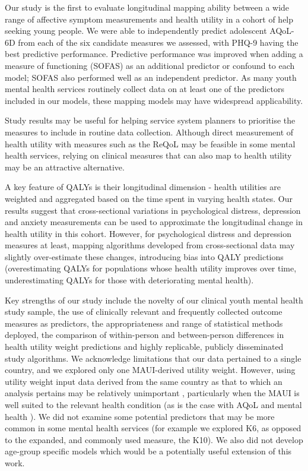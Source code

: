 \documentclass[
  journal=largetwo,
  manuscript=original-article,
  year=2023-Submission,
]{cup-journal}
\begin{document}
Our study is the first to evaluate longitudinal mapping ability between a wide range of affective symptom measurements and health utility in a cohort of help seeking young people. We were able to independently predict adolescent AQoL-6D from each of the six candidate measures we assessed, with PHQ-9 having the best predictive performance. Predictive performance was improved when adding a measure of functioning (SOFAS) as an additional predictor or confound to each model; SOFAS also performed well as an independent predictor. As many youth mental health services routinely collect data on at least one of the predictors included in our models, these mapping models may have widespread applicability.

Study results may be useful for helping service system planners to prioritise the measures to include in routine data collection. Although direct measurement of health utility with measures such as the ReQoL \autocite{KEETHARUTH2021281} may be feasible in some mental health services, relying on clinical measures that can also map to health utility may be an attractive alternative.

A key feature of QALYs is their longitudinal dimension - health utilities are weighted and aggregated based on the time spent in varying health states. Our results suggest that cross-sectional variations in psychological distress, depression and anxiety measurements can be used to approximate the longitudinal change in health utility in this cohort. However, for psychological distress and depression measures at least, mapping algorithms developed from cross-sectional data may slightly over-estimate these changes, introducing bias into QALY predictions (overestimating QALYs for populations whose health utility improves over time, underestimating QALYs for those with deteriorating mental health).

Key strengths of our study include the novelty of our clinical youth mental health study sample, the use of clinically relevant and frequently collected outcome measures as predictors, the appropriateness and range of statistical methods deployed, the comparison of within-person and between-person differences in health utility weight predictions and highly replicable, publicly disseminated study algorithms. We acknowledge limitations that our data pertained to a single country, and we explored only one MAUI-derived utility weight. However, using utility weight input data derived from the same country as that to which an analysis pertains may be relatively unimportant \autocite{homecountryhypo}, particularly when the MAUI is well suited to the relevant health condition (as is the case with AQoL and mental health \autocite{RN6}). We did not examine some potential predictors that may be more common in some mental health services (for example we explored K6, as opposed to the expanded, and commonly used measure, the K10). We also did not develop age-group specific models which would be a potentially useful extension of this work.
\end{document}
